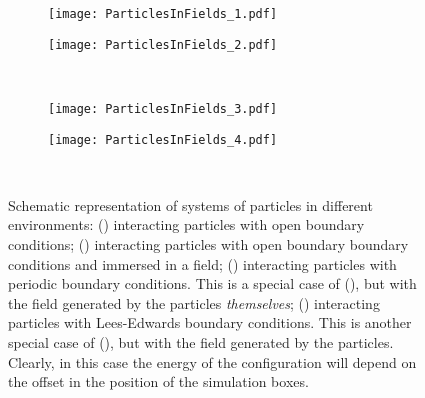 \begin{figure}[!h]
	\centering
	\begin{subfigure}[b]{0.45\textwidth}
			\centering
			\texttt{[image: ParticlesInFields\_1.pdf]}
			\caption{\label{fig:OpenSystem}}
	\end{subfigure} 
		\begin{subfigure}[b]{0.45\textwidth}
			\centering
			\texttt{[image: ParticlesInFields\_2.pdf]}
			\caption{\label{fig:OpenSystemField}}
	\end{subfigure} \\
		\begin{subfigure}[b]{0.45\textwidth}
			\centering
			\texttt{[image: ParticlesInFields\_3.pdf]}
			\caption{\label{fig:PeriodicBoundaries}}
	\end{subfigure} 
		\begin{subfigure}[b]{0.45\textwidth}
			\centering
			\texttt{[image: ParticlesInFields\_4.pdf]}
			\caption{\label{fig:LeesEdwardsBoundaries}}
	\end{subfigure} \\
\caption{Schematic representation of systems of particles in different environments: 
() interacting particles with open boundary conditions; 
() interacting particles with open boundary boundary conditions and immersed in a field;
() interacting particles with periodic boundary conditions. This is a special case of (), but with the field generated by the particles \emph{themselves};
() interacting particles with Lees-Edwards boundary conditions. This is another special case of (), but with the field generated by the particles. Clearly, in this case the energy of the configuration will depend on the offset in the position of the simulation boxes.
\label{fig:ParticlesInFields}}
\end{figure}

